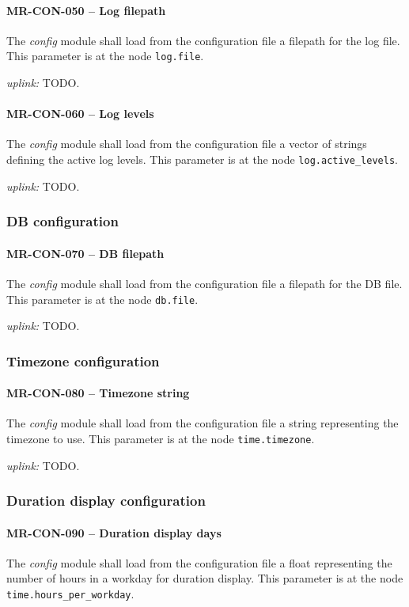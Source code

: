 \paragraph{MR-CON-050 -- Log filepath}
The \emph{config} module shall load from the configuration file a filepath
for the log file. This parameter is at the node \lstinline{log.file}.

\textit{uplink: } TODO.

\paragraph{MR-CON-060 -- Log levels}
The \emph{config} module shall load from the configuration file a vector of
strings defining the active log levels. This parameter is at the node
\lstinline{log.active_levels}.

\textit{uplink: } TODO.

\subsubsection{DB configuration}
\paragraph{MR-CON-070 -- DB filepath}
The \emph{config} module shall load from the configuration file a filepath
for the DB file. This parameter is at the node \lstinline{db.file}.

\textit{uplink: } TODO.

\subsubsection{Timezone configuration}
\paragraph{MR-CON-080 -- Timezone string}
The \emph{config} module shall load from the configuration file a string
representing the timezone to use. This parameter is at the node
\lstinline{time.timezone}.

\textit{uplink: } TODO.

\subsubsection{Duration display configuration}
\paragraph{MR-CON-090 -- Duration display days}
The \emph{config} module shall load from the configuration file a float
representing the number of hours in a workday for duration display.
This parameter is at the node \lstinline{time.hours_per_workday}.

